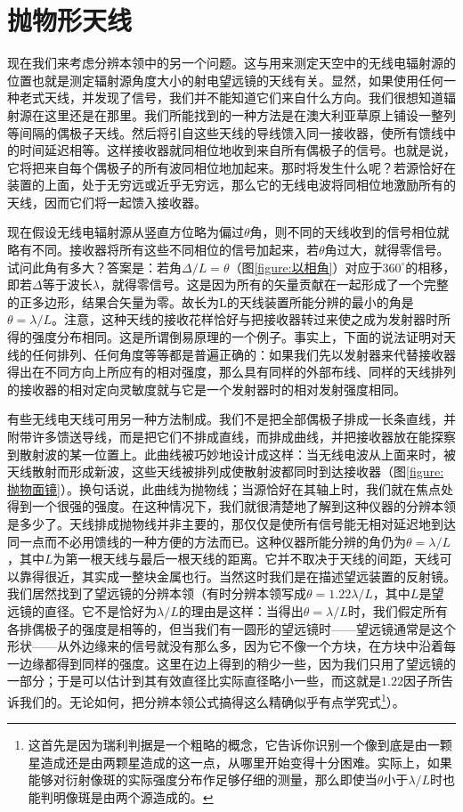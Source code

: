\section{抛物形天线}

现在我们来考虑分辨本领中的另一个问题。这与用来测定天空中的无线电辐射源的位置也就是测定辐射源角度大小的射电望远镜的天线有关。显然，如果使用任何一种老式天线，并发现了信号，我们并不能知道它们来自什么方向。我们很想知道辐射源在这里还是在那里。我们所能找到的一种方法是在澳大利亚草原上铺设一整列等间隔的偶极子天线。然后将引自这些天线的导线馈入同一接收器，使所有馈线中的时间延迟相等。这样接收器就同相位地收到来自所有偶极子的信号。也就是说，它将把来自每个偶极子的所有波同相位地加起来。那时将发生什么呢？若源恰好在装置的上面，处于无穷远或近乎无穷远，那么它的无线电波将同相位地激励所有的天线，因而它们将一起馈入接收器。

现在假设无线电辐射源从竖直方位略为偏过$\theta$角，则不同的天线收到的信号相位就略有不同。接收器将所有这些不同相位的信号加起来，若$\theta$角过大，就得零信号。试问此角有多大？答案是：若角$\Delta/L=\theta$（图\ref{figure:以相角}）对应于$360^\circ$的相移，即若$\Delta$等于波长$\lambda$，就得零信号。这是因为所有的矢量贡献在一起形成了一个完整的正多边形，结果合矢量为零。故长为L的天线装置所能分辨的最小的角是$\theta=\lambda/L$。注意，这种天线的接收花样恰好与把接收器转过来使之成为发射器时所得的强度分布相同。这是所谓倒易原理的一个例子。事实上，下面的说法证明对天线的任何排列、任何角度等等都是普遍正确的：如果我们先以发射器来代替接收器得出在不同方向上所应有的相对强度，那么具有同样的外部布线、同样的天线排列的接收器的相对定向灵敏度就与它是一个发射器时的相对发射强度相同。

有些无线电天线可用另一种方法制成。我们不是把全部偶极子排成一长条直线，并附带许多馈送导线，而是把它们不排成直线，而排成曲线，并把接收器放在能探察到散射波的某一位置上。此曲线被巧妙地设计成这样：当无线电波从上面来时，被天线散射而形成新波，这些天线被排列成使散射波都同时到达接收器（图\ref{figure:抛物面镜}）。换句话说，此曲线为抛物线；当源恰好在其轴上时，我们就在焦点处得到一个很强的强度。在这种情况下，我们就很清楚地了解到这种仪器的分辨本领是多少了。天线排成抛物线并非主要的，那仅仅是使所有信号能无相对延迟地到达同一点而不必用馈线的一种方便的方法而已。这种仪器所能分辨的角仍为$\theta=\lambda/L$，其中$L$为第一根天线与最后一根天线的距离。它并不取决于天线的间距，天线可以靠得很近，其实成一整块金属也行。当然这时我们是在描述望远装置的反射镜。我们居然找到了望远镜的分辨本领（有时分辨本领写成$\theta=1.22\lambda/L$，其中$L$是望远镜的直径。它不是恰好为$\lambda/L$的理由是这样：当得出$\theta=\lambda/L$时，我们假定所有各排偶极子的强度是相等的，但当我们有一圆形的望远镜时——望远镜通常是这个形状——从外边缘来的信号就没有那么多，因为它不像一个方块，在方块中沿着每一边缘都得到同样的强度。这里在边上得到的稍少一些，因为我们只用了望远镜的一部分；于是可以估计到其有效直径比实际直径略小一些，而这就是$1.22$因子所告诉我们的。无论如何，把分辨本领公式搞得这么精确似乎有点学究式\footnote{这首先是因为瑞利判据是一个粗略的概念，它告诉你识别一个像到底是由一颗星造成还是由两颗星造成的这一点，从哪里开始变得十分困难。实际上，如果能够对衍射像斑的实际强度分布作足够仔细的测量，那么即使当$\theta$小于$\lambda/L$时也能判明像斑是由两个源造成的。}）。

